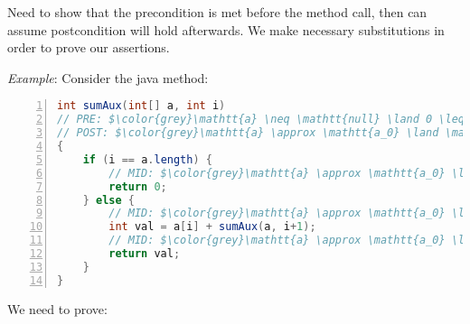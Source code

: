 \documentclass[10pt,twoside,twocolumn]{article}
\begin{document}
Need to show that the precondition is met before the method call,
then can assume postcondition will hold afterwards. We make necessary
substitutions in order to prove our assertions.

\emph{Example}: Consider the java method:
\begin{lstlisting}[language=Java,numbers=left,numberstyle={\footnotesize},basicstyle={\small\ttfamily},tabsize=4,mathescape=true,xleftmargin={5.0ex},commentstyle={\color{grey}}]
int sumAux(int[] a, int i)
// PRE: $\color{grey}\mathtt{a} \neq \mathtt{null} \land 0 \leq \mathtt{i} \leq \mathtt{a.length}$
// POST: $\color{grey}\mathtt{a} \approx \mathtt{a_0} \land \mathtt{r} = \sum \mathtt{a}[\mathtt{i}..\mathtt{a.length})$
{
	if (i == a.length) {
		// MID: $\color{grey}\mathtt{a} \approx \mathtt{a_0} \land \mathtt{i} = \mathtt{a.length}$
		return 0;
	} else {
		// MID: $\color{grey}\mathtt{a} \approx \mathtt{a_0} \land \mathtt{a} \neq \mathtt{null} \land 0 \leq \mathtt{i} < \mathtt{a.length}$
		int val = a[i] + sumAux(a, i+1);
		// MID: $\color{grey}\mathtt{a} \approx \mathtt{a_0} \land \mathtt{val} = \mathtt{a}[\mathtt{i}..\mathtt{a.length})$
		return val;
	}
}
\end{lstlisting}
We need to prove:
\end{document}

